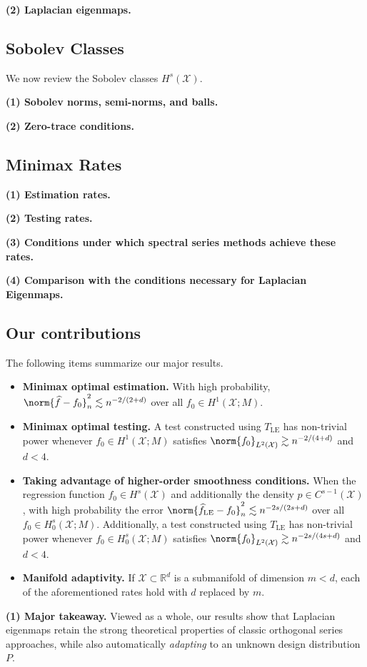 \documentclass{article}
\newcommand{\Reals}{\mathbb{R}}
\newcommand{\1}{\mathbf{1}}
\newcommand{\Rd}{\Reals^d}
\newcommand{\Xset}{\mathcal{X}}
\newcommand{\Leb}{L}
\newcommand{\mc}[1]{\mathcal{#1}}
\newcommand{\wh}[1]{\widehat{#1}}
\newcommand{\LE}{\mathrm{LE}}
\theoremstyle{alden}
\theoremstyle{aldenthm}
\theoremstyle{definition}
\theoremstyle{remark}
\begin{document}
\textbf{(2) Laplacian eigenmaps.}

\subsection{Sobolev Classes}
\label{sec:sobolev}
We now review the Sobolev classes $H^s(\mc{X})$. 

\textbf{(1) Sobolev norms, semi-norms, and balls.} 

\textbf{(2) Zero-trace conditions.}

\subsection{Minimax Rates}
\label{subsec:minimax_rates_sobolev}

\textbf{(1) Estimation rates.}

\textbf{(2) Testing rates.}

\textbf{(3) Conditions under which spectral series methods achieve these rates.}

\textbf{(4) Comparison with the conditions necessary for Laplacian Eigenmaps.}

\subsection{Our contributions}
The following items summarize our major results.
\begin{itemize}
	\item \textbf{Minimax optimal estimation.} With high probability, $\norm{\wh{f} - f_0}_{n}^2 \lesssim n^{-2/(2 + d)}$ over all $f_0 \in H^1(\Xset;M)$. 
	\item \textbf{Minimax optimal testing.}
	A test constructed using $T_{\LE}$ has non-trivial power whenever $f_0 \in H^1(\Xset;M)$ satisfies $\norm{f_0}_{\Leb^2(\Xset)} \gtrsim n^{-2/(4 + d)}$ and $d < 4$.
	\item \textbf{Taking advantage of higher-order smoothness conditions.} When the regression function $f_0 \in H^s(\Xset)$ and additionally the density $p \in C^{s - 1}(\mc{X})$, with high probability the error $\norm{\wh{f}_{\LE} - f_0}_{n}^2 \lesssim n^{-2s/(2s + d)}$ over all $f_0 \in H_0^s(\Xset;M)$. Additionally, a test constructed using $T_{\LE}$ has non-trivial power whenever $f_0 \in H_0^s(\Xset;M)$ satisfies $\norm{f_0}_{\Leb^2(\Xset)} \gtrsim n^{-2s/(4s + d)}$ and $d < 4$.
	\item \textbf{Manifold adaptivity.}
	If $\mc{X} \subset \Rd$ is a submanifold of dimension $m < d$, each of the aforementioned rates hold with $d$ replaced by $m$.
\end{itemize}
\textbf{(1) Major takeaway.} Viewed as a whole, our results show that Laplacian eigenmaps retain the strong theoretical properties of classic orthogonal series approaches, while also automatically \emph{adapting} to an unknown design distribution $P$.
\end{document}
